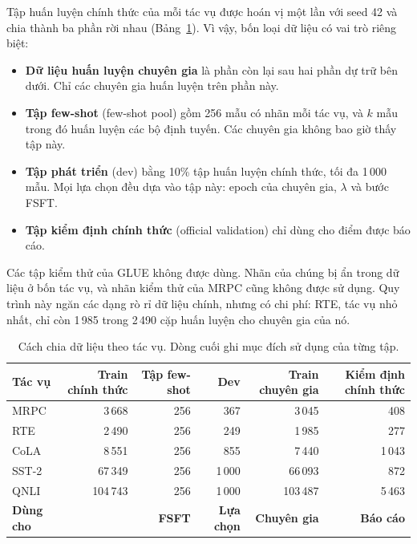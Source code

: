 Tập huấn luyện chính thức của mỗi tác vụ được hoán vị một lần với seed 42 và chia thành ba phần rời nhau (Bảng~\ref{tab:split}). Vì vậy, bốn loại dữ liệu có vai trò riêng biệt:

\begin{itemize}
  \item \textbf{Dữ liệu huấn luyện chuyên gia} là phần còn lại sau hai phần dự trữ bên dưới. Chỉ các chuyên gia huấn luyện trên phần này.
  \item \textbf{Tập few-shot} (few-shot pool) gồm 256 mẫu có nhãn mỗi tác vụ, và $k$ mẫu trong đó huấn luyện các bộ định tuyến. Các chuyên gia không bao giờ thấy tập này.
  \item \textbf{Tập phát triển} (dev) bằng 10\% tập huấn luyện chính thức, tối đa 1\,000 mẫu. Mọi lựa chọn đều dựa vào tập này: epoch của chuyên gia, $\lambda$ và bước FSFT.
  \item \textbf{Tập kiểm định chính thức} (official validation) chỉ dùng cho điểm được báo cáo.
\end{itemize}

Các tập kiểm thử của GLUE không được dùng. Nhãn của chúng bị ẩn trong dữ liệu ở bốn tác vụ, và nhãn kiểm thử của MRPC cũng không được sử dụng. Quy trình này ngăn các dạng rò rỉ dữ liệu chính, nhưng có chi phí: RTE, tác vụ nhỏ nhất, chỉ còn 1\,985 trong 2\,490 cặp huấn luyện cho chuyên gia của nó.

\begin{table}[htbp]
  \centering\tablestyle
  \caption{Cách chia dữ liệu theo tác vụ. Dòng cuối ghi mục đích sử dụng của từng tập.}
  \label{tab:split}
  \begin{tabular}{l r r r r r}
    \toprule
    Tác vụ & Train chính thức & Tập few-shot & Dev & Train chuyên gia & Kiểm định chính thức\\
    \midrule
    MRPC & 3\,668 & 256 & 367 & 3\,045 & 408\\
    RTE & 2\,490 & 256 & 249 & 1\,985 & 277\\
    CoLA & 8\,551 & 256 & 855 & 7\,440 & 1\,043\\
    SST-2 & 67\,349 & 256 & 1\,000 & 66\,093 & 872\\
    QNLI & 104\,743 & 256 & 1\,000 & 103\,487 & 5\,463\\
    \midrule
    \textbf{Dùng cho} & & \textbf{FSFT} & \textbf{Lựa chọn} & \textbf{Chuyên gia} & \textbf{Báo cáo}\\
    \bottomrule
  \end{tabular}
\end{table}

